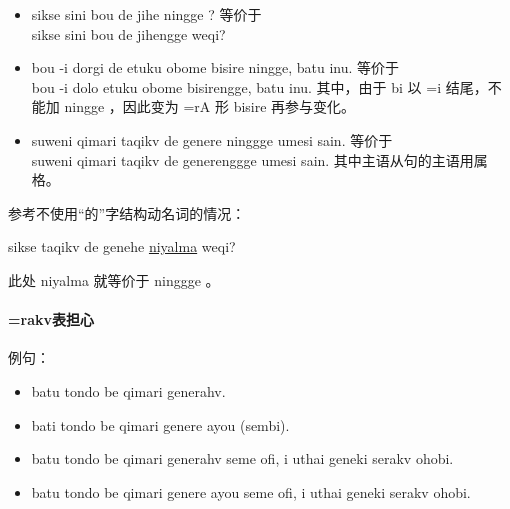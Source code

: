 \begin{itemize}
    \item sikse sini bou de jihe ningge ? 等价于\\
          sikse sini bou de jihengge weqi?
    \item bou -i dorgi de etuku obome bisire ningge, batu inu. 等价于\\
          bou -i dolo etuku obome bisirengge, batu inu. 其中，由于 bi 以 =i 结尾，不能加 ningge ，因此变为 =rA 形 bisire 再参与变化。
    \item suweni qimari taqikv de genere ninggge umesi sain. 等价于\\
          suweni qimari taqikv de generenggge umesi sain. 其中主语从句的主语用属格。
\end{itemize}

参考不使用“的”字结构动名词的情况：

sikse taqikv de genehe \underline{niyalma} weqi?

此处 niyalma 就等价于 ninggge 。

\paragraph{=rakv表担心} 例句：

\begin{itemize}
    \item batu tondo be qimari generahv.
    \item bati tondo be qimari genere ayou (sembi).
    \item batu tondo be qimari generahv seme ofi, i uthai geneki serakv ohobi.
    \item batu tondo be qimari genere ayou seme ofi, i uthai geneki serakv ohobi.
\end{itemize}


